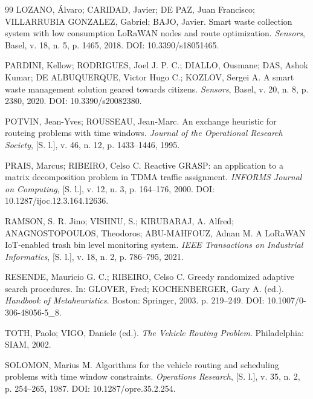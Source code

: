\documentclass[12pt, a4paper]{article}
\begin{document}
\begin{thebibliography}{99}
LOZANO, \'Alvaro; CARIDAD, Javier; DE PAZ, Juan Francisco; VILLARRUBIA GONZALEZ, Gabriel; BAJO, Javier. Smart waste collection system with low consumption LoRaWAN nodes and route optimization. \textit{Sensors}, Basel, v. 18, n. 5, p. 1465, 2018. DOI: 10.3390/s18051465.

PARDINI, Kellow; RODRIGUES, Joel J. P. C.; DIALLO, Ousmane; DAS, Ashok Kumar; DE ALBUQUERQUE, Victor Hugo C.; KOZLOV, Sergei A. A smart waste management solution geared towards citizens. \textit{Sensors}, Basel, v. 20, n. 8, p. 2380, 2020. DOI: 10.3390/s20082380.

POTVIN, Jean-Yves; ROUSSEAU, Jean-Marc. An exchange heuristic for routeing problems with time windows. \textit{Journal of the Operational Research Society}, [S. l.], v. 46, n. 12, p. 1433--1446, 1995.

PRAIS, Marcus; RIBEIRO, Celso C. Reactive GRASP: an application to a matrix decomposition problem in TDMA traffic assignment. \textit{INFORMS Journal on Computing}, [S. l.], v. 12, n. 3, p. 164--176, 2000. DOI: 10.1287/ijoc.12.3.164.12636.

RAMSON, S. R. Jino; VISHNU, S.; KIRUBARAJ, A. Alfred; ANAGNOSTOPOULOS, Theodoros; ABU-MAHFOUZ, Adnan M. A LoRaWAN IoT-enabled trash bin level monitoring system. \textit{IEEE Transactions on Industrial Informatics}, [S. l.], v. 18, n. 2, p. 786--795, 2021.

RESENDE, Mauricio G. C.; RIBEIRO, Celso C. Greedy randomized adaptive search procedures. In: GLOVER, Fred; KOCHENBERGER, Gary A. (ed.). \textit{Handbook of Metaheuristics}. Boston: Springer, 2003. p. 219--249. DOI: 10.1007/0-306-48056-5\_8.

TOTH, Paolo; VIGO, Daniele (ed.). \textit{The Vehicle Routing Problem}. Philadelphia: SIAM, 2002.

SOLOMON, Marius M. Algorithms for the vehicle routing and scheduling problems with time window constraints. \textit{Operations Research}, [S. l.], v. 35, n. 2, p. 254--265, 1987. DOI: 10.1287/opre.35.2.254.

\end{thebibliography}
\end{document}
